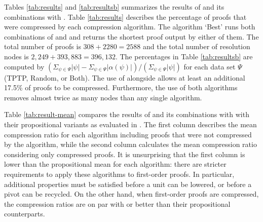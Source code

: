 Tables \ref{tab:results} and \ref{tab:resultsb} summarizes the results of {\FORPI} and its combinations with {\GFOLU}. 
Table \ref{tab:results} describes the percentage of proofs that were compressed by each compression algorithm. 
The algorithm `Best' runs both combinations of {\GFOLU} and {\FORPI} and returns the shortest proof output by either of them. 
The total number of proofs is $308+2280=2588$ and the total number of resolution nodes is $2,249 + 393,883
= 396,132$. 
The percentages in Table \ref{tab:resultsb}  are computed by $(\Sigma_{\psi \in \Psi} |\psi|  - \Sigma_{\psi\in \Psi} |\alpha(\psi)|)/(\Sigma_{\psi \in \Psi} |\psi|)$ for each data set $\Psi$ (TPTP, Random, or Both). 
The use of {\FORPI} alongside {\GFOLU} allows at least an additional 17.5\% of proofs to be compressed. 
Furthermore, the use of both algorithms removes almost twice as many nodes than any single algorithm.

Table \ref{tab:result-mean} compares the results of {\FORPI} and its combinations with {\GFOLU} with their propositional variants as evaluated in  \cite{Boudou}. 
The first column describes the mean compression ratio for each algorithm including proofs that were not compressed by the algorithm, while the second column calculates the mean compression ratio considering only compressed proofs. 
It is unsurprising that the first column is lower than the propositional mean for each algorithm: there are stricter requirements to apply these algorithms to first-order proofs. 
In particular, additional properties must be satisfied before a unit can be lowered, or before a pivot can be recycled. 
On the other hand, when first-order proofs are compressed, the compression ratios are on par with or better than their propositional counterparts.

